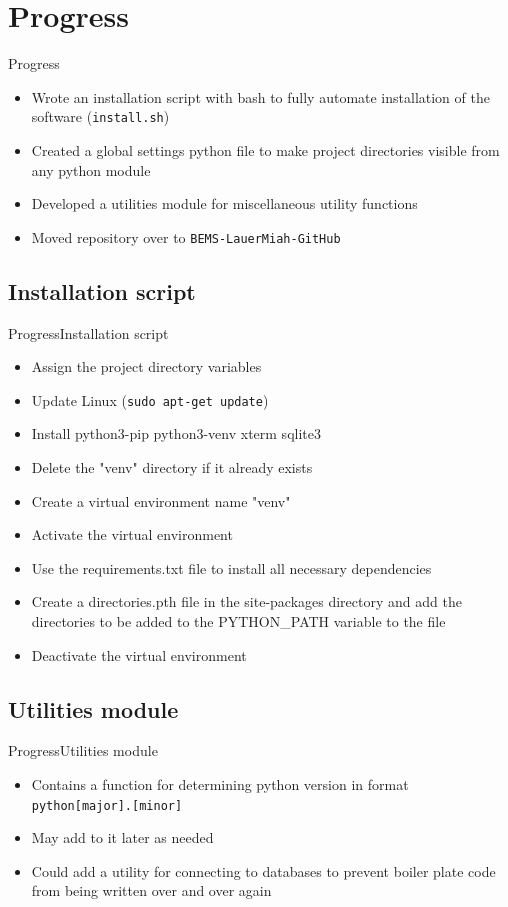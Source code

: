 \documentclass{beamer}
\begin{document}
\section{Progress}
\begin{frame}{Progress}{}
\begin{itemize}
	\item Wrote an installation script with bash to fully automate installation of the software (\texttt{install.sh})
	\item Created a global settings python file to make project directories visible from any python module
	\item Developed a utilities module for miscellaneous utility functions
	\item Moved repository over to \texttt{BEMS-LauerMiah-GitHub}
\end{itemize}
\end{frame}

\subsection{Installation script}
\begin{frame}{Progress}{Installation script}
\begin{itemize}
	\item Assign the project directory variables
	\item Update Linux (\texttt{sudo apt-get update})
	\item Install python3-pip python3-venv xterm sqlite3	
	\item Delete the "venv" directory if it already exists
	\item Create a virtual environment name "venv"
	\item Activate the virtual environment
	\item Use the requirements.txt file to install all necessary dependencies
	\item Create a directories.pth file in the site-packages directory and add the directories to be added to the PYTHON\_PATH variable to the file
	\item Deactivate the virtual environment
\end{itemize}
\end{frame}

\subsection{Utilities module}
\begin{frame}{Progress}{Utilities module}
\begin{itemize}
	\item Contains a function for determining python version in format \texttt{python[major].[minor]}
	\item May add to it later as needed
	\item Could add a utility for connecting to databases to prevent boiler plate code from being written over and over again
\end{itemize}
\end{frame}
\end{document}
